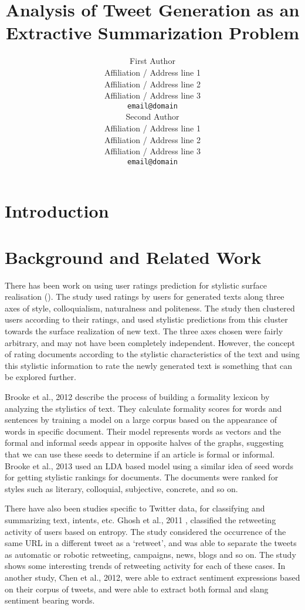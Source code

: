 \documentclass[11pt]{article}
\title{Analysis of Tweet Generation as an Extractive Summarization Problem}
\author{First Author \\
  Affiliation / Address line 1 \\
  Affiliation / Address line 2 \\
  Affiliation / Address line 3 \\
  {\tt email@domain} \\\And
  Second Author \\
  Affiliation / Address line 1 \\
  Affiliation / Address line 2 \\
  Affiliation / Address line 3 \\
  {\tt email@domain} \\}
\date{}
\begin{document}
\maketitle
\begin{abstract}
\end{abstract}


\section{Introduction}

\section{Background and Related Work}

There has been work on using user ratings prediction for stylistic surface realisation (\cite{dethlefs2014cluster}). The study used ratings by users for generated texts along three axes of style, colloquialism, naturalness and politeness. The study then clustered users according to their ratings, and used stylistic predictions from this cluster towards the surface realization of new text. The three axes chosen were fairly arbitrary, and may not have been completely independent. However, the concept of rating documents according to the stylistic characteristics of the text and using this stylistic information to rate the newly generated text is something that can be explored further. 

Brooke et al., 2012 \cite{brooke2012building} describe the process of building a formality lexicon by analyzing the stylistics of text. They calculate formality scores for words and sentences by training a model on a large corpus based on the appearance of words in specific document. Their model represents words as vectors and the formal and informal seeds appear in opposite halves of the graphs, suggesting that we can use these seeds to determine if an article is formal or informal. Brooke et al., 2013 \cite{brooke2013multi} used an LDA based model using a similar idea of seed words for getting stylistic rankings for documents. The documents were ranked for styles such as literary, colloquial, subjective, concrete, and so on. 

There have also been studies specific to Twitter data, for classifying and summarizing text, intents, etc. Ghosh et al., 2011 \cite{ghosh2011entropy}, classified the retweeting activity of users based on entropy. The study considered the occurrence of the same URL in a different tweet as a ‘retweet’, and was able to separate the tweets as automatic or robotic retweeting, campaigns, news, blogs and so on. The study shows some interesting trends of retweeting activity for each of these cases. In another study, Chen et al., 2012, were able to extract sentiment expressions based on their corpus of tweets, and were able to extract both formal and slang sentiment bearing words. 
\end{document}
